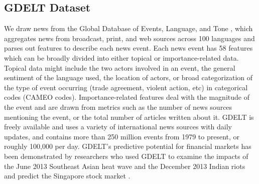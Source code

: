 \subsection{GDELT Dataset}
We draw news from the Global Database of Events, Language, and Tone \cite{GDELT}, which aggregates news from broadcast, print, and web sources across 100 languages and parses out features to describe each news event. Each news event has 58 features which can be broadly divided into either topical or importance-related data. Topical data might include the two actors involved in an event, the general sentiment of the language used, the location of actors, or broad categorization of the type of event occurring (trade agreement, violent action, etc) in categorical codes (CAMEO codes). Importance-related features deal with the magnitude of the event and are drawn from metrics such as the number of news sources mentioning the event, or the total number of articles written about it. GDELT is freely available and uses a variety of international news sources with daily updates, and contains more than 250 million events from 1979 to present, or roughly 100,000 per day. GDELT's predictive potential for financial markets has been demonstrated by researchers who used GDELT to examine the impacts of the June 2013 Southeast Asian heat wave and the December 2013 Indian riots and predict the Singapore stock market \cite{phua2014visual}.
